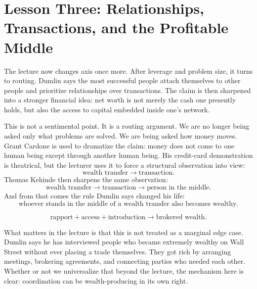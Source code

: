 \section{Lesson Three: Relationships, Transactions, and the Profitable Middle}

The lecture now changes axis once more. After leverage and problem size, it turns to routing. Dumlin says the most successful people attach themselves to other people and prioritize relationships over transactions. The claim is then sharpened into a stronger financial idea: net worth is not merely the cash one presently holds, but also the access to capital embedded inside one's network.

This is not a sentimental point. It is a routing argument. We are no longer being asked only what problems are solved. We are being asked how money moves. Grant Cardone is used to dramatize the claim: money does not come to one human being except through another human being. His credit-card demonstration is theatrical, but the lecturer uses it to force a structural observation into view:
\begin{equation}
\text{wealth transfer} \to \text{transaction}.
\end{equation}
Thomas Kehinde then sharpens the same observation:
\begin{equation}
\text{wealth transfer} \to \text{transaction} \to \text{person in the middle}.
\end{equation}
And from that comes the rule Dumlin says changed his life:
\begin{equation}
\text{whoever stands in the middle of a wealth transfer also becomes wealthy}.
\end{equation}

\begin{figure}[h]
\centering
\begin{equation}
\text{rapport} + \text{access} + \text{introduction}
\to
\text{brokered wealth}.
\end{equation}
\end{figure}

What matters in the lecture is that this is not treated as a marginal edge case. Dumlin says he has interviewed people who became extremely wealthy on Wall Street without ever placing a trade themselves. They got rich by arranging meetings, brokering agreements, and connecting parties who needed each other. Whether or not we universalize that beyond the lecture, the mechanism here is clear: coordination can be wealth-producing in its own right.

